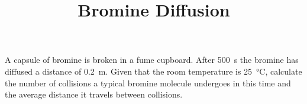 \documentclass{article}
\title{Bromine Diffusion}
\begin{document}
\maketitle

A capsule of bromine is broken in a fume cupboard. After \SI{500}{\second} the bromine has diffused a distance of \SI{0.2}{\metre}. Given that the room temperature is \SI{25}{\celsius}, calculate the number of collisions a typical bromine molecule undergoes in this time and the average distance it travels between collisions.
\end{document}
